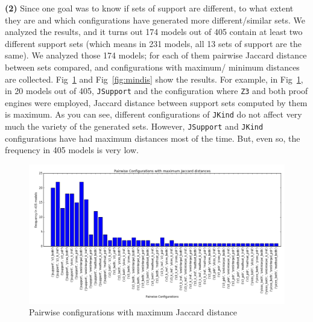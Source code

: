 \noindent{}
 \vspace{9pt}
 
\textbf{(2)} Since one goal was to know if sets of support are different, to what extent they are and which configurations have generated more different/similar sets. We analyzed the results, 
and it turns out 174 models out of 405 contain at least two different support sets (which means in 231 models, all 13 sets of support are the same). We analyzed those 174 models; for each of them pairwise Jaccard distance between sets compared, and configurations with maximum/ minimum distances are collected. Fig~\ref{fig:maxdis} and Fig~\ref{fig:mindis} show the results. For example, in Fig~\ref{fig:maxdis}, in 20 models out of 405, \texttt{JSupport} and the configuration where \texttt{Z3} and both proof engines were employed, Jaccard distance between support sets computed by them is maximum. As you can see, different configurations of \texttt{JKind} do not affect very much the variety of the generated sets. However, \texttt{JSupport} and \texttt{JKind} configurations have had maximum distances most of the time. But, even so, the frequency in 405 models is very low.

\begin{figure}
  \centering
  \includegraphics[width=\textwidth]{figs/max_settings_analyses.png}
  \caption{Pairwise configurations with maximum Jaccard distance}\label{fig:maxdis}
\end{figure}

